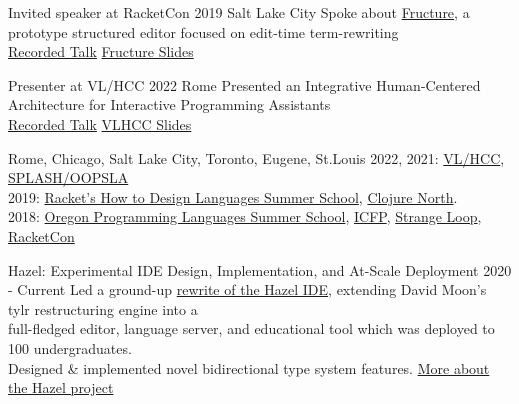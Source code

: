 \documentclass[10pt,a4paper]{article}
\begin{document}

  \headedsubsection
    {Invited speaker at RacketCon}
    {2019 \sbull Salt Lake City}
    {Spoke about \href{https://github.com/disconcision/fructure}{Fructure}, a prototype structured editor focused on edit-time term-rewriting \\
    \href{https://www.youtube.com/watch?v=CnbVCNIh1NA}{Recorded Talk} \sbull
    \href{https://github.com/disconcision/fructure/blob/master/screenshots/REAL-RacketCon-Fructure-Talk.pdf}{Fructure Slides}}

  \headedsubsection
    {Presenter at VL/HCC}
    {2022 \sbull Rome}
    {Presented an Integrative Human-Centered Architecture for Interactive Programming Assistants \\
    \href{https://www.youtube.com/watch?v=G_9Yyut3ckw}{Recorded Talk} \sbull
    \href{https://docs.google.com/presentation/d/1lrclRzlx-ayd_iqOENyvCtnexBgTpkaSltPmgQQi_IE/edit?usp=sharing}{VLHCC Slides}}
    
    {Rome, Chicago, Salt Lake City, Toronto, Eugene, St.Louis}
    {2022, 2021: \href{https://conf.researchr.org/home/vlhcc-2022}{VL/HCC}, \href{https://2021.splashcon.org/track/splash-2021-oopsla}{SPLASH/OOPSLA} \\
    2019: \href{https://school.racket-lang.org/2019/plan/}{Racket's How to Design Languages Summer School}, \href{https://clojurenorth.com/}{Clojure North}. \\ 
    2018: \href{https://www.cs.uoregon.edu/research/summerschool/summer18/}{Oregon Programming Languages Summer School}, \href{https://conf.researchr.org/home/icfp-2018}{ICFP}, \href{https://www.thestrangeloop.com/2018/sessions.html}{Strange Loop}, \href{https://con.racket-lang.org/2018/}{RacketCon}}
    

  \headedsubsection
    {Hazel: Experimental IDE Design, Implementation, and At-Scale Deployment}
    {2020 - Current}
    {Led a ground-up \href{https://hazel.org/build/haz3l-tests/}{rewrite of the Hazel IDE}, extending David Moon's tylr restructuring engine into a \\ full-fledged editor, language server, and educational tool which was deployed to 100 undergraduates.\\ Designed \& implemented novel bidirectional type system features. \href{https://hazel.org/}{More about the Hazel project}}
\end{document}
